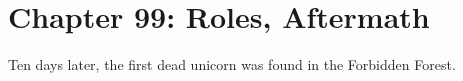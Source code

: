 \chapter{Chapter 99: Roles, Aftermath}
Ten days later, the first dead unicorn was found in the Forbidden Forest.
